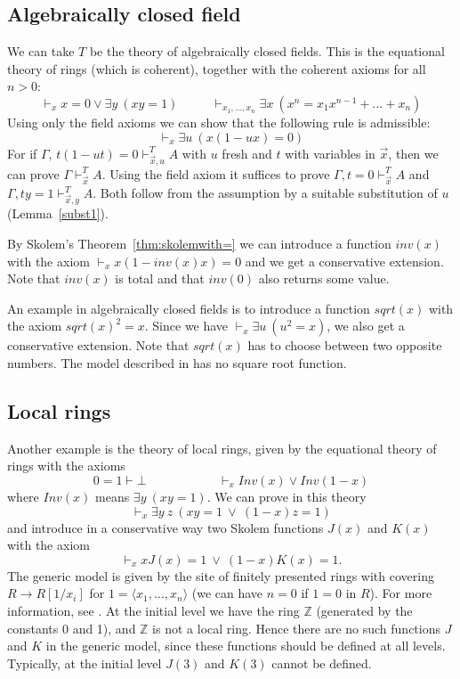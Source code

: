 \documentclass{fundam}
\newcommand{\ideal}[1]{\langle #1\rangle}
\newcommand{\ints}{\mathbb{Z}}
\newcommand{\Inv}{\mathit{Inv}}
\begin{document}
\subsection{Algebraically closed field}

We can take $T$ be the theory of algebraically closed fields. 
This is the equational theory of rings (which is coherent), together with the 
coherent axioms for all $n>0$:
$$
\vdash_x x = 0 \vee \exists y~(xy = 1)~~~~~~~~~~~~
\vdash_{x_1,\dots,x_n} \exists x~(x^n = x_1 x^{n-1} + \dots + x_n)
$$
Using only the field axioms we can show that the following rule is admissible:
$$
\vdash_{x} \exists u~ (x(1-ux) = 0)
$$
For if $\Gamma,\,t(1-ut) = 0\vdash_{\vec{x},u}^{T} A$ with $u$ fresh and
$t$ with variables in $\vec{x}$, then we can prove $\Gamma\vdash_{\vec{x}}^{T} A$.
Using the field axiom it suffices to prove  $\Gamma,t=0\vdash_{\vec{x}}^{T} A$
and $\Gamma,ty=1\vdash_{\vec{x},y}^{T} A$. 
Both follow from the assumption by a suitable substitution of $u$ (Lemma~\ref{subst1}).  

By Skolem's Theorem~\ref{thm:skolemwith=} we can introduce a function $inv(x)$ with the axiom
$\vdash_x x(1 - inv(x) x) = 0$ and we get a conservative extension. Note that $inv(x)$
is total and that $inv(0)$ also returns some value.

An example in algebraically closed fields is to introduce a function $sqrt(x)$ with the axiom
$sqrt(x)^2 = x$. Since we have $\vdash_{x} \exists u~(u^2 = x)$, we also get a conservative
extension. Note that $sqrt(x)$ has to choose between two opposite numbers.
The model described in \cite{Mannaa} has no square root function.

\subsection{Local rings}

Another example is the theory of local rings, given by the equational theory of rings
with the axioms
$$
0=1\vdash\bot~~~~~~~~~~~~~~~~~~~~~~~~~~\vdash_x \Inv(x)\vee \Inv(1-x)
$$
where $\Inv(x)$ means $\exists y~(xy = 1)$. We can prove in this theory
$$
\vdash_x \exists y~z~(x y = 1~\vee ~(1-x) z = 1)
$$
and introduce in a conservative way two Skolem functions $J(x)$ and $K(x)$ with the axiom
$$
\vdash_x xJ(x) = 1~\vee~(1-x)K(x) = 1.
$$
The generic model is given by the site of finitely presented rings with covering
$R\rightarrow R[1/x_i]$ for $1 = \ideal{x_1,\dots,x_n}$ 
(we can have $n = 0$ if $1=0$ in $R$).
For more information, see \cite[Ch.\ VIII, Section 6]{MLM94}.
At the initial level we have the ring $\ints$ (generated by the
constants 0 and 1), and $\ints$ is not a local ring. 
Hence there are no such functions $J$ and $K$ in the generic model,
since these functions should be defined at all levels. 
Typically, at the initial level $J(3)$ and $K(3)$ cannot be defined. 
\end{document}
